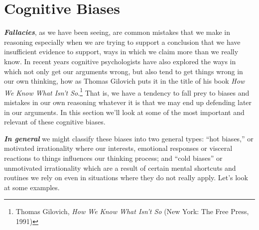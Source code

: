 \documentclass[
  12pt, openany]{book}
\theoremstyle{definition}
\theoremstyle{definition}
\theoremstyle{definition}
\theoremstyle{remark}
\begin{document}
\hypertarget{cognitive-biases}{%
\section{Cognitive Biases}\label{cognitive-biases}}

\textbf{\emph{Fallacies}}, as we have been seeing, are common mistakes that we make in reasoning especially when we are trying to support a conclusion that we have insufficient evidence to support, ways in which we claim more than we really know. In recent years cognitive psychologists have also explored the ways in which not only get our arguments wrong, but also tend to get things wrong in our own thinking, how as Thomas Gilovich puts it in the title of his book \emph{How We Know What Isn't So}.\footnote{Thomas Gilovich, \emph{How We Know What Isn't So} (New York: The Free Press, 1991)} That is, we have a tendency to fall prey to biases and mistakes in our own reasoning whatever it is that we may end up defending later in our arguments. In this section we'll look at some of the most important and relevant of these cognitive biases.

\textbf{\emph{In general}} we might classify these biases into two general types: ``hot biases,'' or motivated irrationality where our interests, emotional responses or visceral reactions to things influences our thinking process; and ``cold biases'' or unmotivated irrationality which are a result of certain mental shortcuts and routines we rely on even in situations where they do not really apply. Let's look at some examples.
\end{document}
